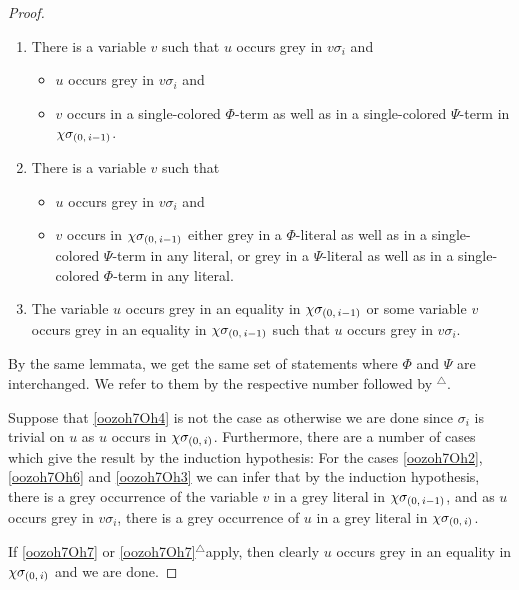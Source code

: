 \documentclass[,%
	draft=false,%
	numbers=noendperiod
	12pt,
	a4paper,
	oneside,%
	openany,
]{memoir}
\newcommand{\inv}{\ensuremath{\chi}}
\begin{document}
\begin{proof}
\begin{enumerate}
		\item
			\label{oozoh7Oh6}
			There is a variable $v$ such that $u$ occurs grey in $v\sigma_i$ and 
			{
				\renewcommand{\labelitemi}{\textendash}
				\begin{itemize}
					\item $u$ occurs grey in $v\sigma_i$ and
					\item
						$v$ occurs in a single-colored $\Phi$-term as well as in a single-colored $\Psi$-term in $\inv\sigmazmi$.
				\end{itemize}
			}


		\item 
			\label{oozoh7Oh3}
			There is a variable $v$ such that
			{
				\renewcommand{\labelitemi}{\textendash}
				\begin{itemize}
					\item $u$ occurs grey in $v\sigma_i$ and
					\item
						$v$ occurs in $\inv\sigmazmi$
						either grey in a $\Phi$-literal as well as in a single-colored $\Psi$-term in any literal, 
						or grey in a $\Psi$-literal as well as in a single-colored $\Phi$-term in any literal.
				\end{itemize}
			}


		\item
			\label{oozoh7Oh7}
			The variable $u$ occurs grey in an equality in $\inv\sigmazmi$
			or 
			some variable $v$ occurs grey in an equality in $\inv\sigmazmi$ such that $u$ occurs grey in $v\sigma_i$.

	\end{enumerate}

	\newcommand{\othercase}{$^\triangle$}

	By the same lemmata, we get the same set of statements where $\Phi$ and $\Psi$ are interchanged. We refer to them by the respective number followed by \othercase.

	Suppose that \ref{oozoh7Oh4} is not the case as otherwise we are done since $\sigma_i$ is trivial on $u$ as $u$ occurs in $\inv\sigmazi$.
	Furthermore, there are a number of cases which give the result by the induction hypothesis:
	For the cases \ref{oozoh7Oh2}, \ref{oozoh7Oh6} and \ref{oozoh7Oh3} we can infer that by the induction hypothesis, there is a grey occurrence of the variable $v$ in a grey literal in $\inv\sigmazmi$, and as $u$ occurs grey in $v\sigma_i$, there is a grey occurrence of $u$ in a grey literal in $\inv\sigmazi$.

	If \ref{oozoh7Oh7} or \ref{oozoh7Oh7}\othercase apply, then clearly $u$ occurs grey in an equality in $\inv\sigmazi$ and we are done.


\end{proof}
\end{document}

